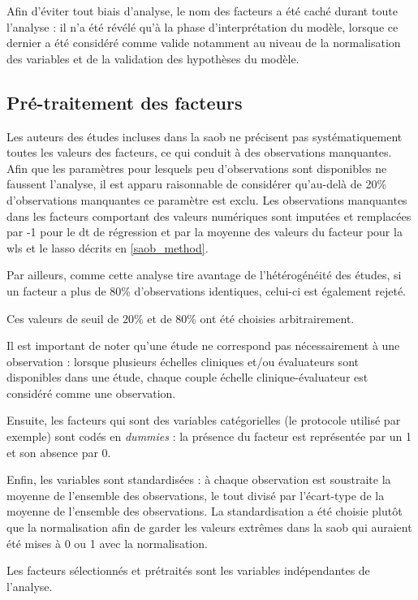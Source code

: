 Afin d'éviter tout biais d'analyse, le nom des facteurs a été caché durant toute l'analyse : il n'a été révélé qu'à la phase d'interprétation du modèle, lorsque ce dernier a été considéré 
comme valide notamment au niveau de la normalisation des variables et de la validation des hypothèses du modèle.  

\subsection{Pré-traitement des facteurs} \label{preprocessing}

Les auteurs des études incluses dans la \gls{saob} ne précisent pas systématiquement toutes les valeurs des facteurs, ce qui conduit à des observations manquantes. 
Afin que les paramètres pour lesquels peu d'observations sont disponibles ne faussent l'analyse, il est apparu raisonnable de considérer qu'au-delà de 20\%
d'observations manquantes ce paramètre est exclu. Les observations manquantes dans les facteurs comportant des valeurs numériques sont 
imputées et remplacées par -1 pour le \gls{dt} de régression et par la moyenne des valeurs du facteur pour la \gls{wls} et le \gls{lasso} décrits en \ref{saob_method}. 

Par ailleurs, comme cette analyse tire avantage de l'hétérogénéité des études, si un facteur a plus de 80\% d'observations identiques, 
celui-ci est également rejeté. 

Ces valeurs de seuil de 20\% et de 80\% ont été choisies arbitrairement.

Il est important de noter qu'une étude ne correspond pas nécessairement à une observation : lorsque plusieurs échelles cliniques et/ou évaluateurs sont disponibles dans une étude,
chaque couple échelle clinique-évaluateur est considéré comme une observation.

Ensuite, les facteurs qui sont des variables catégorielles (le protocole utilisé par exemple) sont codés en \textit{dummies} : la présence du facteur est représentée par un 1 et son absence par 0. 

Enfin, les variables sont standardisées : à chaque observation est soustraite la moyenne de l'ensemble des observations, le tout divisé par l'écart-type de la moyenne de 
l'ensemble des observations. La standardisation a été choisie plutôt que la normalisation afin de garder les valeurs extrêmes dans la \gls{saob} qui auraient été mises à 0 ou 1 avec 
la normalisation. 

Les facteurs sélectionnés et prétraités sont les variables indépendantes de l'analyse.

